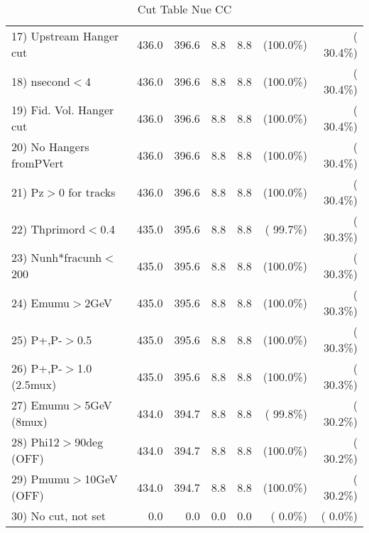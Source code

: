 \begin{table}[h!]
\begin{tabular}{||l||r|r|r|r|r|r||}
 17) Upstream Hanger cut  &        436.0 &        396.6 &          8.8 &          8.8 & (100.0\%) & ( 30.4\%) \\
 18) nsecond$<$4          &        436.0 &        396.6 &          8.8 &          8.8 & (100.0\%) & ( 30.4\%) \\
 19) Fid. Vol. Hanger cut &        436.0 &        396.6 &          8.8 &          8.8 & (100.0\%) & ( 30.4\%) \\
 20) No Hangers fromPVert &        436.0 &        396.6 &          8.8 &          8.8 & (100.0\%) & ( 30.4\%) \\
 21) Pz$>$0 for tracks    &        436.0 &        396.6 &          8.8 &          8.8 & (100.0\%) & ( 30.4\%) \\
 22) Thprimord$<$0.4      &        435.0 &        395.6 &          8.8 &          8.8 & ( 99.7\%) & ( 30.3\%) \\
 23) Nunh*fracunh$<$200   &        435.0 &        395.6 &          8.8 &          8.8 & (100.0\%) & ( 30.3\%) \\
 24) Emumu$>$2GeV         &        435.0 &        395.6 &          8.8 &          8.8 & (100.0\%) & ( 30.3\%) \\
 25) P+,P-$>$0.5          &        435.0 &        395.6 &          8.8 &          8.8 & (100.0\%) & ( 30.3\%) \\
 26) P+,P-$>$1.0 (2.5mux) &        435.0 &        395.6 &          8.8 &          8.8 & (100.0\%) & ( 30.3\%) \\
 27) Emumu$>$5GeV  (8mux) &        434.0 &        394.7 &          8.8 &          8.8 & ( 99.8\%) & ( 30.2\%) \\
 28) Phi12$>$90deg  (OFF) &        434.0 &        394.7 &          8.8 &          8.8 & (100.0\%) & ( 30.2\%) \\
 29) Pmumu$>$10GeV  (OFF) &        434.0 &        394.7 &          8.8 &          8.8 & (100.0\%) & ( 30.2\%) \\
 30) No cut, not set      &          0.0 &          0.0 &          0.0 &          0.0 & (  0.0\%) & (  0.0\%) \\
 \hline
 \hline
 \end{tabular}
 \caption{Cut Table   Nue CC  }
 \label{tab-cutheavy_neutrino_1.500}
 \end{table}
